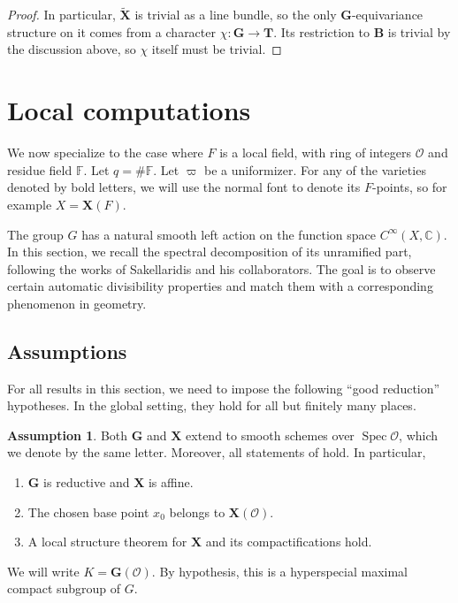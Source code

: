 \documentclass{amsart}
\theoremstyle{definition}
\theoremstyle{remark}
\newcommand{\1}{\mathbf{1}}
\newcommand{\C}{\mathbb{C}}
\newcommand{\F}{\mathbb{F}}
\newcommand{\mb}[1]{\mathbf{#1}}
\newcommand{\Or}{\mathcal{O}}
\DeclareMathOperator{\spec}{Spec}
\theoremstyle{definition}
\newtheorem{assumption}[theorem]{Assumption}
\newcommand{\bG}{\mathbf{G}}
\begin{document}
\begin{proof}
    In particular, $\widetilde{\mb{X}}$ is trivial as a line bundle, so the only $\mb{G}$-equivariance structure on it comes from a character $\chi:\mb{G}\to\mb{T}$. Its restriction to $\mb{B}$ is trivial by the discussion above, so $\chi$ itself must be trivial.
\end{proof}

\section{Local computations}\label{sec:Local}
We now specialize to the case where $F$ is a local field, with ring of integers $\Or$ and residue field $\F$. Let $q=\#\F$. Let $\varpi$ be a uniformizer. For any of the varieties denoted by bold letters, we will use the normal font to denote its $F$-points, so for example $X=\mb{X}(F)$.

The group $G$ has a natural smooth left action on the function space $C^\infty(X,\C)$. In this section, we recall the spectral decomposition of its unramified part, following the works of Sakellaridis and his collaborators. The goal is to observe certain automatic divisibility properties and match them with a corresponding phenomenon in geometry.

\subsection{Assumptions}\label{ss:LocalAssumption}
For all results in this section, we need to impose the following ``good reduction'' hypotheses. In the global setting, they hold for all but finitely many places.
\begin{assumption}
  Both $\bG$ and $\mb{X}$ extend to smooth schemes over $\spec\Or$, which we denote by the same letter. Moreover, all statements of \cite[Proposition 2.3.5]{SakANT} hold. In particular,
  \begin{enumerate}
    \item $\bG$ is reductive and $\mb{X}$ is affine.
    \item The chosen base point $x_0$ belongs to $\mb{X}(\Or)$.
    \item A local structure theorem for $\mb{X}$ and its compactifications hold.
  \end{enumerate}
\end{assumption}

We will write $K=\bG(\Or)$. By hypothesis, this is a hyperspecial maximal compact subgroup of $G$.
\end{document}
